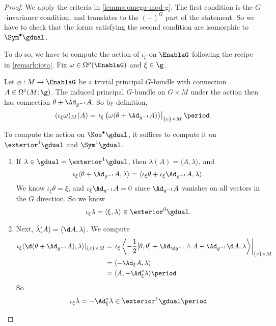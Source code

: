 \begin{proof}
  We apply the criteria in \cref{lemma:omega-mod-g}. The first condition is the $G$-invariance condition, and translates to the $(-)^G$ part of the statement. So we have to check that the forms satisfying the second condition are isomorphic to $\Sym^\bullet\gdual$.

  To do so, we have to compute the action of $\iota_\xi$ on $\EnablaG$ following the recipe in \cref{remark:iota}. Fix $\omega \in \Omega^p(\EnablaG)$ and $\xi \in\g$.

  Let $\phi: M \to \EnablaG$ be a trivial principal $G$-bundle with connection $A \in \Omega^1(M;\g)$. The induced principal $G$-bundle on $G \times M$ under the action then has connection $\theta + \Ad_{g^{-1}} A$. So by definition,
  \begin{equation*}
    (\iota_\xi \omega)_M(A) = \left.\iota_\xi \left(\omega(\theta + \Ad_{g^{-1}} A)\right)\right|_{\{e\} \times M}\period
  \end{equation*}

  To compute the action on $\Kos^\bullet\gdual$, it suffices to compute it on $\exterior^1\gdual$ and $\Sym^1\gdual$.

  \begin{enumerate}[(1)]
    \item If $\lambda \in\gdual = \exterior^1\gdual$, then $\lambda(A) = \langle A, \lambda\rangle$, and
      \begin{equation*}
        \iota_\xi \langle \theta + \Ad_{g^{-1}} A, \lambda\rangle = \langle \iota_\xi \theta + \iota_\xi \Ad_{g^{-1}} A, \lambda\rangle.
      \end{equation*}
      We know $\iota_\xi \theta = \xi$, and $\iota_\xi \Ad_{g^{-1}} A = 0$ since $\Ad_{g^{-1}} A$ vanishes on all vectors in the $G$ direction. So we know
      \begin{equation*}
        \iota_\xi \lambda = \langle \xi, \lambda\rangle \in \exterior^0\gdual.
      \end{equation*}

    \item Next, $\tilde{\lambda}(A) = \langle \d A, \lambda \rangle$. We compute
      \begin{align*}
        \iota_\xi \langle \d (\theta + \Ad_{g^{-1}}A), \lambda \rangle|_{\{e\} \times M} &= \left.\iota_\xi \left\langle -\frac{1}{2}[\theta, \theta] + \Ad_{\d g^{-1}} \wedge A + \Ad_{g^{-1}} \d A, \lambda\right\rangle\right|_{\{e\} \times M} \\
        &= \langle -\Ad_\xi A, \lambda\rangle \\ 
        &= \langle A, -\Ad_\xi^* \lambda\rangle \period
      \end{align*}
      So
      \begin{equation*}
        \iota_\xi \tilde{\lambda} = -\Ad^*_\xi \lambda \in \exterior^1\gdual \period
      \end{equation*}
  \end{enumerate}


\end{proof}
